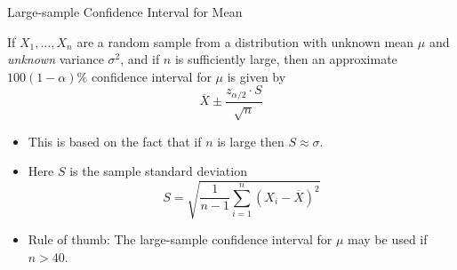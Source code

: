 \documentclass[t,handout]{beamer}
\begin{document}
    
    \begin{frame}{Large-sample Confidence Interval for Mean}
    \begin{block}{}
    If $X_1,\dots,X_n$ are a random sample from a distribution with unknown mean $\mu$ and \textit{unknown} variance $\sigma^2$, and if $n$ is sufficiently large, then an approximate $100(1-\alpha)\%$ confidence interval for $\mu$ is given by
    $$\overline{X} \pm \frac{z_{\alpha/2}\cdot S}{\sqrt{n}}$$
    \end{block}
    \begin{itemize}
    \pause\item This is based on the fact that if $n$ is large then $S \approx \sigma$.
    \pause\item Here $S$ is the sample standard deviation
    $$S=\sqrt{\frac1{n-1}\sum_{i=1}^n (X_i-\overline{X})^2}$$
    \pause\item Rule of thumb: The large-sample confidence interval for $\mu$ may be used if $n>40$.
    \end{itemize}
    \end{frame}
    
\end{document}
